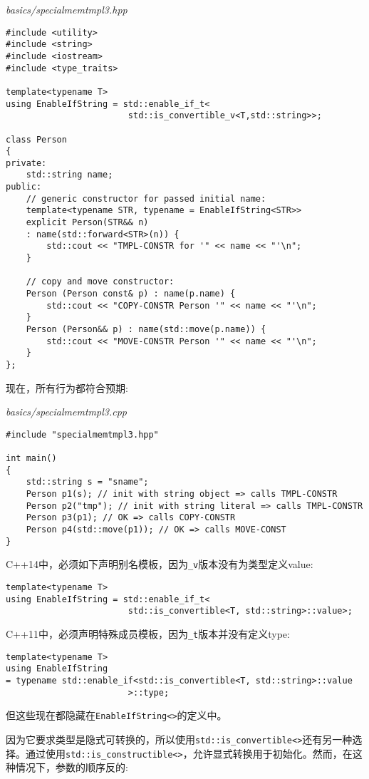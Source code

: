 \noindent
\textit{basics/specialmemtmpl3.hpp}
\begin{lstlisting}[style=styleCXX]
#include <utility>
#include <string>
#include <iostream>
#include <type_traits>

template<typename T>
using EnableIfString = std::enable_if_t<
						std::is_convertible_v<T,std::string>>;

class Person
{
private:
	std::string name;
public:
	// generic constructor for passed initial name:
	template<typename STR, typename = EnableIfString<STR>>
	explicit Person(STR&& n)
	: name(std::forward<STR>(n)) {
		std::cout << "TMPL-CONSTR for '" << name << "'\n";
	}

	// copy and move constructor:
	Person (Person const& p) : name(p.name) {
		std::cout << "COPY-CONSTR Person '" << name << "'\n";
	}
	Person (Person&& p) : name(std::move(p.name)) {
		std::cout << "MOVE-CONSTR Person '" << name << "'\n";
	}
};
\end{lstlisting}

现在，所有行为都符合预期:

\noindent
\textit{basics/specialmemtmpl3.cpp}
\begin{lstlisting}[style=styleCXX]
#include "specialmemtmpl3.hpp"

int main()
{
	std::string s = "sname";
	Person p1(s); // init with string object => calls TMPL-CONSTR
	Person p2("tmp"); // init with string literal => calls TMPL-CONSTR
	Person p3(p1); // OK => calls COPY-CONSTR
	Person p4(std::move(p1)); // OK => calls MOVE-CONST
}
\end{lstlisting}

C++14中，必须如下声明别名模板，因为\texttt{\_v}版本没有为类型定义value:

\begin{lstlisting}[style=styleCXX]
template<typename T>
using EnableIfString = std::enable_if_t<
						std::is_convertible<T, std::string>::value>;
\end{lstlisting}

C++11中，必须声明特殊成员模板，因为\texttt{\_t}版本并没有定义type:

\begin{lstlisting}[style=styleCXX]
template<typename T>
using EnableIfString
= typename std::enable_if<std::is_convertible<T, std::string>::value
						>::type;
\end{lstlisting}

但这些现在都隐藏在\texttt{EnableIfString<>}的定义中。

因为它要求类型是隐式可转换的，所以使用\texttt{std::is\_convertible<>}还有另一种选择。通过使用\texttt{std::is\_constructible<>}，允许显式转换用于初始化。然而，在这种情况下，参数的顺序反的:

